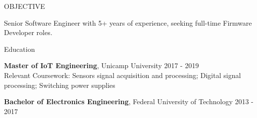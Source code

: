 \documentclass{resume} %
\begin{document}

\begin{rSection}{OBJECTIVE}

{Senior Software Engineer with 5+ years of experience, seeking full-time Firmware Developer roles.}


\end{rSection}

\begin{rSection}{Education}

{\bf Master of IoT Engineering}, Unicamp University \hfill {2017 - 2019}\\
Relevant Coursework: Sensors signal acquisition and processing; Digital signal processing; Switching power supplies

{\bf Bachelor of Electronics Engineering}, Federal University of Technology  \hfill {2013 - 2017}


\end{rSection}
\end{document}
